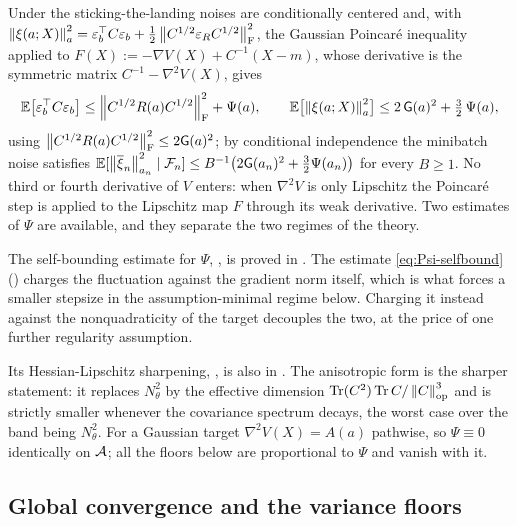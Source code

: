 Under  the sticking-the-landing noises are conditionally centered and,
with $\left\lVert \xi(a;X)\right\rVert_{a}^2=\varepsilon_b^\top C\varepsilon_b+\tfrac12\left\lVert C^{1/2}\varepsilon_RC^{1/2}\right\rVert_{\mathrm{F}}^2$,
the Gaussian Poincar\'e inequality applied to $F(X):=-\nabla V(X)+C^{-1}(X-m)$, whose derivative is the
symmetric matrix $C^{-1}-\nabla^2V(X)$, gives
\begin{equation}
\label{eq:intrinsic-STL}
    \mathbb{E}\bigl[\varepsilon_b^\top C\varepsilon_b\bigr]\leq\left\lVert C^{1/2}R(a)C^{1/2}\right\rVert_{\mathrm{F}}^2+\Psi(a),
    \qquad
    \mathbb{E}\bigl[\left\lVert \xi(a;X)\right\rVert_{a}^2\bigr]\leq2\,\mathsf{G}(a)^2+\tfrac32\,\Psi(a),
\end{equation}
using $\left\lVert C^{1/2}R(a)C^{1/2}\right\rVert_{\mathrm{F}}^2\leq2\mathsf{G}(a)^2$; by conditional independence the
minibatch noise satisfies
$\mathbb{E}[\left\lVert \overline\xi_n\right\rVert_{a_n}^2\mid\mathcal{F}_n]\leq B^{-1}\bigl(2\mathsf{G}(a_n)^2+\tfrac32\Psi(a_n)\bigr)$
for every $B\geq1$. No third or fourth derivative of $V$ enters: when $\nabla^2V$ is only Lipschitz the
Poincar\'e step is applied to the Lipschitz map $F$ through its weak derivative. Two estimates of
$\Psi$ are available, and they separate the two regimes of the theory.

The self-bounding estimate for $\Psi$, , is proved in .
The estimate \eqref{eq:Psi-selfbound} () charges the fluctuation against the gradient norm itself, which
is what forces a smaller stepsize in the assumption-minimal regime below. Charging it instead against
the nonquadraticity of the target decouples the two, at the price of one further regularity
assumption.

Its Hessian-Lipschitz sharpening, , is also in .
The anisotropic form is the sharper statement: it replaces $N_\theta^2$ by the effective dimension
$\operatorname{Tr}(C^2)\operatorname{Tr} C/\left\lVert C\right\rVert_{\mathrm{op}}^3$ and is strictly smaller whenever the covariance spectrum decays, the
worst case over the band being $N_\theta^2$. For a Gaussian target $\nabla^2V(X)=A(a)$ pathwise, so
$\Psi\equiv0$ identically on $\mathcal{A}$; all the floors below are proportional to $\Psi$ and vanish with
it.

\subsection{Global convergence and the variance floors}
\label{subsec:stoch-global}

